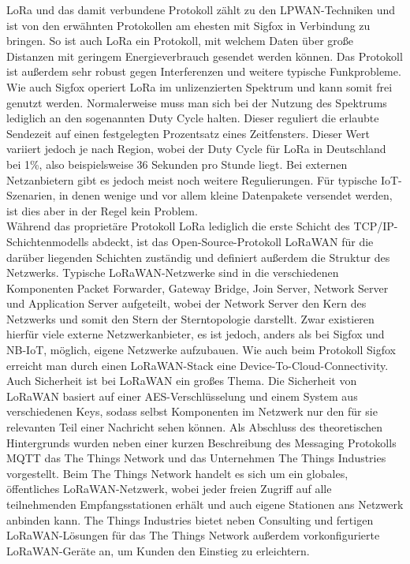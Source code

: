 LoRa und das damit verbundene Protokoll zählt zu den LPWAN-Techniken und ist von den erwähnten Protokollen am ehesten mit Sigfox in Verbindung zu bringen. So ist auch LoRa ein Protokoll, mit welchem Daten über große Distanzen mit geringem Energieverbrauch gesendet werden können. Das Protokoll ist außerdem sehr robust gegen Interferenzen und weitere typische Funkprobleme. Wie auch Sigfox operiert LoRa im unlizenzierten Spektrum und kann somit frei genutzt werden. Normalerweise muss man sich bei der Nutzung des Spektrums lediglich an den sogenannten Duty Cycle halten. Dieser reguliert die erlaubte Sendezeit auf einen festgelegten Prozentsatz eines Zeitfensters. Dieser Wert variiert jedoch je nach Region, wobei der Duty Cycle für LoRa in Deutschland bei 1\%, also beispielsweise 36 Sekunden pro Stunde liegt. Bei externen Netzanbietern gibt es jedoch meist noch weitere Regulierungen. Für typische IoT-Szenarien, in denen wenige und vor allem kleine Datenpakete versendet werden, ist dies aber in der Regel kein Problem.\\ 
Während das proprietäre Protokoll LoRa lediglich die erste Schicht des TCP/IP-Schichtenmodells abdeckt, ist das Open-Source-Protokoll LoRaWAN für die darüber liegenden Schichten zuständig und definiert außerdem die Struktur des Netzwerks. Typische LoRaWAN-Netzwerke sind in die verschiedenen Komponenten Packet Forwarder, Gateway Bridge, Join Server, Network Server und Application Server aufgeteilt, wobei der Network Server den Kern des Netzwerks und somit den Stern der Sterntopologie darstellt. Zwar existieren hierfür viele externe Netzwerkanbieter, es ist jedoch, anders als bei Sigfox und NB-IoT, möglich, eigene Netzwerke aufzubauen. Wie auch beim Protokoll Sigfox erreicht man durch einen LoRaWAN-Stack eine Device-To-Cloud-Connectivity. Auch Sicherheit ist bei LoRaWAN ein großes Thema. Die Sicherheit von LoRaWAN basiert auf einer AES-Verschlüsselung und einem System aus verschiedenen Keys, sodass selbst Komponenten im Netzwerk nur den für sie relevanten Teil einer Nachricht sehen können. Als Abschluss des theoretischen Hintergrunds wurden neben einer kurzen Beschreibung des \mbox{Messaging} Protokolls MQTT das The Things Network und das Unternehmen The Things Industries vorgestellt. Beim The Things Network handelt es sich um ein globales, öffentliches LoRaWAN-Netzwerk, wobei jeder freien Zugriff auf alle teilnehmenden Empfangsstationen erhält und auch eigene Stationen ans Netzwerk anbinden kann. The Things Industries bietet neben Consulting und fertigen LoRaWAN-Lösungen für das The Things Network außerdem vorkonfigurierte LoRaWAN-Geräte an, um Kunden den Einstieg zu erleichtern.

